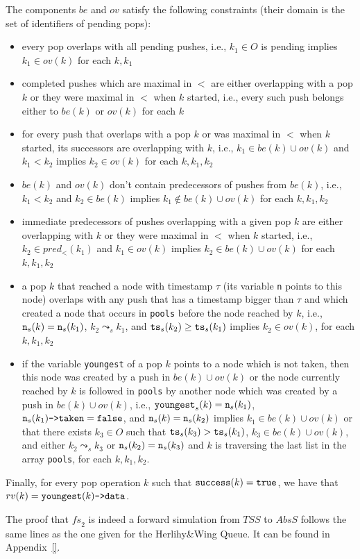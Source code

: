 The components $be$ and $ov$ satisfy the following constraints (their domain is the set of identifiers of pending pops):
\begin{itemize}
	\item every pop overlaps with all pending pushes, i.e., $k_1\in O$ is pending implies $k_1\in ov(k)$ for each $k, k_1$
	\item completed pushes which are maximal in $<$ are either overlapping with a pop $k$ or they were maximal in $<$ when $k$ started, i.e., every such push belongs either to $be(k)$ or $ov(k)$ for each $k$
	\item for every push that overlaps with a pop $k$ or was maximal in $<$ when $k$ started, its successors are overlapping with $k$, i.e., $k_1\in be(k)\cup ov(k)$ and $k_1 < k_2$ implies $k_2 \in ov(k)$ for each $k, k_1, k_2$
	\item $be(k)$ and $ov(k)$ don't contain predecessors of pushes from $be(k)$, i.e., $k_1 < k_2$ and $k_2 \in be(k)$ implies $k_1\not\in be(k)\cup ov(k)$ for each $k, k_1, k_2$
	\item immediate predecessors of pushes overlapping with a given pop $k$ are either overlapping with $k$ or they were maximal in $<$ when $k$ started, i.e., $k_2\in pred_{<}(k_1)$ and $k_1\in ov(k)$ implies $k_2\in be(k)\cup ov(k)$ for each $k,k_1,k_2$
	\item a pop $k$ that reached a node with timestamp $\tau$ (its variable {\tt n} points to this node) overlaps with any push that has a timestamp bigger than $\tau$ and which created a node that occurs in {\tt pools} before the node reached by $k$, i.e., ${\tt n}_s(k)={\tt n}_s(k_1)$, $k_2\leadsto_s k_1$, and ${\tt ts}_s(k_2) \geq {\tt ts}_s(k_1)$ implies $k_2\in ov(k)$, for each $k, k_1, k_2$
	\item if the variable {\tt youngest} of a pop $k$ points to a node which is not taken, then this node was created by a push in $be(k)\cup ov(k)$ or the node currently reached by $k$ is followed in {\tt pools} by another node which was created by a push in $be(k)\cup ov(k)$, i.e., ${\tt youngest}_s(k)={\tt n}_s(k_1)$, ${\tt n}_s(k_1)\text{{\tt ->taken}}={\tt false}$, and ${\tt n}_s(k)={\tt n}_s(k_2)$ implies $k_1\in be(k)\cup ov(k)$ or that there exists $k_3\in O$ such that ${\tt ts}_s(k_3) > {\tt ts}_s(k_1)$, $k_3\in be(k)\cup ov(k)$, and either $k_2\leadsto_s k_3$ or ${\tt n}_s(k_2)={\tt n}_s(k_3)$ and $k$ is traversing the last list in the array {\tt pools}, for each $k, k_1,k_2$.
\end{itemize}
Finally, for every pop operation $k$ such that ${\tt success}(k)={\tt true}$, we have that $rv(k)={\tt youngest}(k)\text{\tt->data}$. 

The proof that $\mathit{fs}_2$ is indeed a forward simulation from $\mathit{TSS}$ to $AbsS$ follows the same lines as the one given for the Herlihy\&Wing Queue. It can be found in Appendix~\ref{}.








